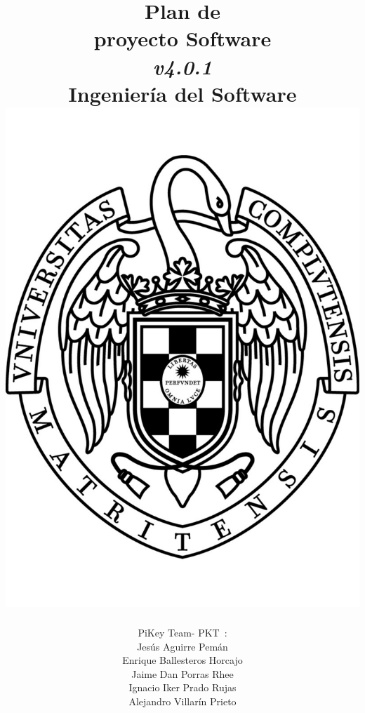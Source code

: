 \documentclass[spanish,a4paper,11pt, twoside]{report}	%
\newcommand*{\PKT}{\hbox{P}\kern-2.5pt\lower3.5pt\hbox{\small{K}}\kern-2.8pt\hbox{T}\kern-2pt}	%
\begin{document}
\renewcommand{\chaptername}{Parte}			%
\renewcommand{\thechapter}{\Roman{chapter}}	%

\title{\textbf{\huge{Plan de \\ 
	proyecto Software}} \\
	\textit{v4.0.1} \\	 \vspace{0.1cm}
	\Large{Ingeniería del Software} \\
	\includegraphics[scale=0.3]{ucm.pdf}}
\author{{\Large{PiKey Team-}} \PKT \ : \vspace{0.2cm} \\
	Jesús Aguirre Pemán \\
	 Enrique Ballesteros Horcajo \\
	 Jaime Dan Porras Rhee \\
	 Ignacio Iker Prado Rujas \\
	 Alejandro Villarín Prieto }
\date{\Today}
\maketitle
\end{document}
